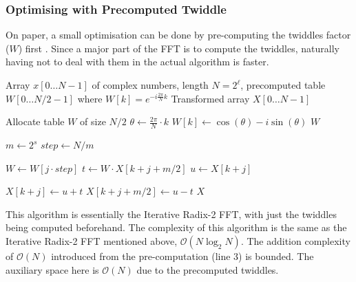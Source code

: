 \documentclass{article}
\begin{document}
\subsubsection{Optimising with Precomputed Twiddle}
On paper, a small optimisation can be done by pre-computing the twiddles factor ($W$) first \cite{frigo2005design}. Since a major part of the FFT is to compute the twiddles, naturally having not to deal with them in the actual algorithm is faster.

\begin{algorithm}[H]
\caption{Iterative Radix-2 FFT with Precomputed Twiddle Table}
\label{alg:iterative_fft_twiddle}
\begin{algorithmic}[1]
\Require Array $x[0 \dots N-1]$ of complex numbers, length $N = 2^\ell$, precomputed table $W[0 \dots N/2 - 1]$ where $W[k] = e^{-i \frac{2\pi}{N} k}$
\Ensure Transformed array $X[0 \dots N-1]$

    \State Allocate table $W$ of size $N/2$
    \State $\theta \gets \frac{2\pi}{N} \cdot k$
        \State $W[k] \gets \cos\left(\theta\right) - i \sin\left(\theta\right)$
    \EndFor
    \State \Return $W$
\EndProcedure

\Statex

    \State {}
    
     
        \State $m \gets 2^s$ 
        \State $step \gets N / m$ 
        
         
             
                \State $W \gets W[j \cdot step]$ 
                \State $t \gets W \cdot X[k + j + m/2]$
                \State $u \gets X[k + j]$
                
                \State $X[k + j] \gets u + t$
                \State $X[k + j + m/2] \gets u - t$
            \EndFor
        \EndFor
    \EndFor
    \State \Return $X$
\EndProcedure
\end{algorithmic}
\end{algorithm}
This algorithm is essentially the Iterative Radix-2 FFT, with just the twiddles being computed beforehand. 
The complexity of this algorithm is the same as the Iterative Radix-2 FFT mentioned above, $\mathcal{O}(N\log_2N)$. The addition complexity of $\mathcal{O}(N)$ introduced from the pre-computation (line 3) is bounded. The auxiliary space here is $\mathcal{O}(N)$ due to the precomputed twiddles.
\end{document}
